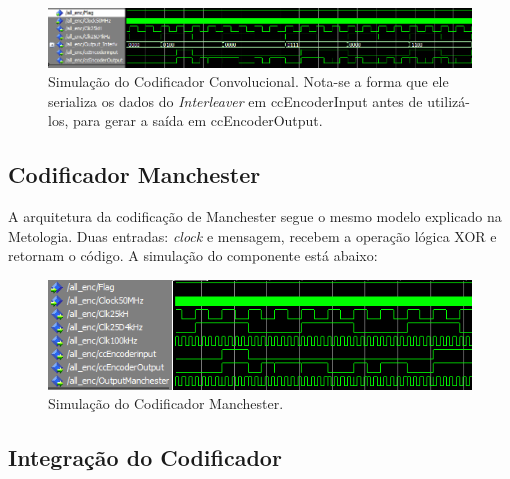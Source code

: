 	\begin{figure}[h]
		\caption{\label{figure:convolutional-simulation}Simulação do Codificador Convolucional. Nota-se a forma que ele serializa os dados do \textit{Interleaver} em ccEncoderInput antes de utilizá-los, para gerar a saída em ccEncoderOutput.}
		\centering
		\includegraphics[width=1\textwidth]{convolutional/simulation.png}
	\end{figure}
	
	\subsection{Codificador Manchester}
	
	A arquitetura da codificação de Manchester segue o mesmo modelo explicado na Metologia. Duas entradas: \textit{clock} e mensagem, recebem a operação lógica XOR e retornam o código. A simulação do componente está abaixo:
	
	\begin{figure}[h!]
		\caption{\label{figure:manchester-encoder-simulation}Simulação do Codificador Manchester.}
		\centering
		\includegraphics[width=0.5\textheight]{manchester/simulation-encoder.png}
	\end{figure}
	
	
	\subsection{Integração do Codificador}\label{section:execution-integration-encoder-speeds}
	
